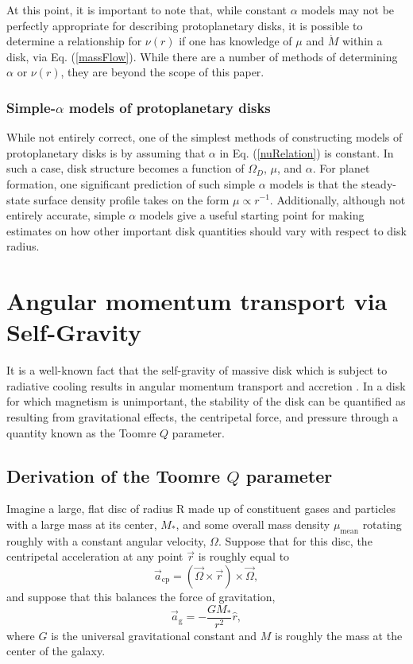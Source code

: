 \documentclass[aps,pra,twocolumn]{revtex4-1}
\begin{document}
At this point, it is important to note that, while constant $\alpha$ models may not be perfectly appropriate for describing protoplanetary disks, it is possible to determine a relationship for $\nu(r)$ if one has knowledge of $\mu$ and $\dot{M}$ within a disk, via Eq. (\ref{massFlow}).  While there are a number of methods of determining $\alpha$ or $\nu(r)$, they are beyond the scope of this paper.

\subsubsection{\label{section 2.3.1} Simple-$\alpha$ models of protoplanetary disks}
While not entirely correct, one of the simplest methods of constructing models of protoplanetary disks is by assuming that $\alpha$ in Eq. (\ref{nuRelation}) is constant.  In such a case, disk structure becomes a function of $\Omega_D$, $\mu$, and $\alpha$.  For planet formation, one significant prediction of such simple $\alpha$ models is that the steady-state surface density profile takes on the form $\mu \propto r^{-1}$.  Additionally, although not entirely accurate, simple $\alpha$ models give a useful starting point for making estimates on how other important disk quantities should vary with respect to disk radius.  




\section{\label{section 3} Angular momentum transport via Self-Gravity}
It is a well-known fact that the self-gravity of massive disk which is subject to radiative cooling results in angular momentum transport and accretion \cite{armitage2011}.  In a disk for which magnetism is unimportant, the stability of the disk can be quantified as resulting from gravitational effects, the centripetal force, and pressure through a quantity known as the Toomre $Q$ parameter.

\subsection{\label{section 3.1} Derivation of the Toomre $Q$ parameter}
Imagine a large, flat disc of radius R made up of constituent gases and particles with a large mass at its center, $M_*$, and some overall mass density $\mu_{\text{mean}}$ rotating roughly with a constant angular velocity, $\Omega$. Suppose that for this disc, the centripetal acceleration at any point $\vec{r}$ is roughly equal to 
\begin{equation}
\vec{a}_{\text{cp}} = \left( \vec{\Omega} \times \vec{r} \right) \times \vec{\Omega} ,
\end{equation}
and suppose that this balances the force of gravitation,
\begin{equation}
\vec{a}_{\text{g}} = -\frac{G M_*}{r^2}\hat{r}, 
\end{equation}
where $G$ is the universal gravitational constant and $M$ is roughly the mass at the center of the galaxy.
\end{document}
